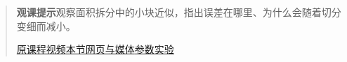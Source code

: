 \begin{quote}\small\textbf{观课提示}\quad 观察面积拆分中的小块近似，指出误差在哪里、为什么会随着切分变细而减小。

\href{https://www.youtube.com/watch?v=WUvTyaaNkzM}{原课程视频}\quad\href{https://vitael04213.github.io/3blue1brown-notes/lessons/essence-of-calculus.html}{本节网页与媒体}\quad\href{https://vitael04213.github.io/3blue1brown-notes/lab.html\#integral}{参数实验}
\end{quote}
